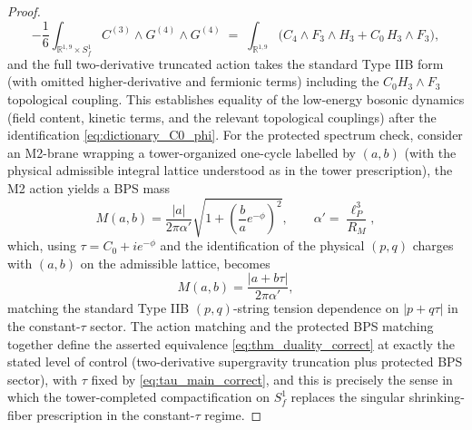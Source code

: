 \documentclass[11pt]{article}
\theoremstyle{remark}
\begin{document}
\begin{proof}
\begin{equation}
-\frac{1}{6}\int_{\mathbb{R}^{1,9}\times S_f^{1}} C^{(3)}\wedge G^{(4)}\wedge G^{(4)}
\;=\;\int_{\mathbb{R}^{1,9}}\!\bigl(C_4\wedge F_3\wedge H_3 + C_0\,H_3\wedge F_3\bigr),
\end{equation}
and the full two-derivative truncated action takes the standard Type IIB form (with omitted higher-derivative and fermionic terms) including the $C_0 H_3\wedge F_3$ topological coupling. This establishes equality of the low-energy bosonic dynamics (field content, kinetic terms, and the relevant topological couplings) after the identification \eqref{eq:dictionary_C0_phi}. For the protected spectrum check, consider an M2-brane wrapping a tower-organized one-cycle labelled by $(a,b)$ (with the physical admissible integral lattice understood as in the tower prescription), the M2 action yields a BPS mass
\begin{equation}\label{eq:M2_mass}
M(a,b)=\frac{|a|}{2\pi\alpha'}\sqrt{1+\left(\frac{b}{a}e^{-\phi}\right)^2},
\qquad
\alpha'=\frac{\ell_P^{3}}{R_M},
\end{equation}
which, using $\tau=C_0+i e^{-\phi}$ and the identification of the physical $(p,q)$ charges with $(a,b)$ on the admissible lattice, becomes
\begin{equation}\label{eq:BPS_match}
M(a,b)=\frac{|a+b\tau|}{2\pi\alpha'},
\end{equation}
matching the standard Type IIB $(p,q)$-string tension dependence on $|p+q\tau|$ in the constant-$\tau$ sector. The action matching and the protected BPS matching together define the asserted equivalence \eqref{eq:thm_duality_correct} at exactly the stated level of control (two-derivative supergravity truncation plus protected BPS sector), with $\tau$ fixed by \eqref{eq:tau_main_correct}, and this is precisely the sense in which the tower-completed compactification on $S_f^{1}$ replaces the singular shrinking-fiber prescription in the constant-$\tau$ regime.
\end{proof}
\end{document}
